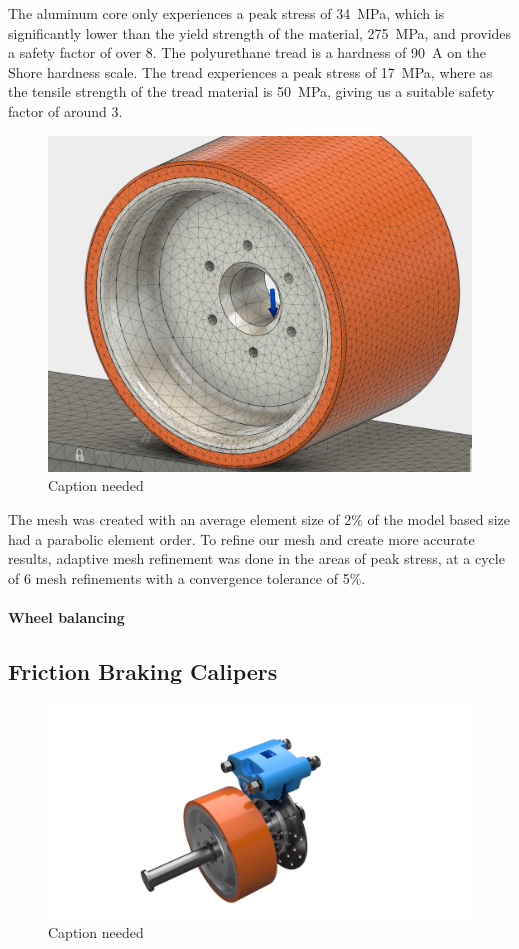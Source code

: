 \documentclass[main.tex]{subfile}
\begin{document}
    The aluminum core only experiences a peak stress of \SI{34}{MPa}, which is significantly lower than the yield strength of the material, \SI{275}{MPa}, and provides a safety factor of over 8. The polyurethane tread is a hardness of \SI{90}{A} on the Shore hardness scale. The tread experiences a peak stress of \SI{17}{MPa}, where as the tensile strength of the tread material is \SI{50}{MPa}, giving us a suitable safety factor of around 3.
    \begin{figure}[H]
        \centering
        \includegraphics[width=\linewidth]{images/fig22}
        \caption{Caption needed}
    \end{figure}
    The mesh was created with an average element size of 2\% of the model based size had a parabolic element order. To refine our mesh and create more accurate results, adaptive mesh refinement was done in the areas of peak stress, at a cycle of 6 mesh refinements with a convergence tolerance of 5\%.

    \paragraph{Wheel balancing}
    \subsection{Friction Braking Calipers}
    \begin{figure}[H]
        \centering
        \includegraphics[width=\linewidth]{images/fig23}
        \caption{Caption needed}
    \end{figure}
\end{document}
